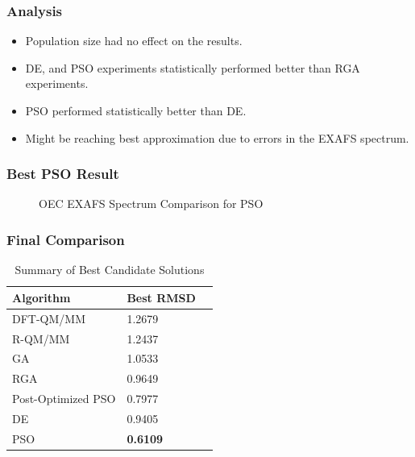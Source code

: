 \documentclass[10pt]{beamer}
\begin{document}
\begin{frame}
	\frametitle{Analysis}

	\begin{itemize}
		\item Population size had no effect on the results.
		\item DE, and PSO experiments statistically performed better than RGA experiments.
		\item PSO performed statistically better than DE.
		\item Might be reaching best approximation due to errors in the EXAFS spectrum.
	\end{itemize}

\end{frame}

\begin{frame}
	\frametitle{Best PSO Result}

	\begin{figure}
		\caption{OEC EXAFS Spectrum Comparison for PSO}
	\end{figure}

\end{frame}

\begin{frame}
	\frametitle{Final Comparison}

	\begin{table}
		\centering
		\begin{tabular}{ | l | l | l | }
			\hline
			Algorithm & Best RMSD \\ \hline
			DFT-QM/MM~\cite{luber2011s1} & 1.2679 \\ \hline
			R-QM/MM~\cite{luber2011s1} & 1.2437 \\ \hline
			GA & 1.0533 \\ \hline
			RGA & 0.9649 \\ \hline
			Post-Optimized PSO & 0.7977 \\ \hline
			DE & 0.9405 \\ \hline
			PSO & \textbf{0.6109} \\ \hline
		\end{tabular}
		\caption{Summary of Best Candidate Solutions}
	\end{table}

\end{frame}
\end{document}
